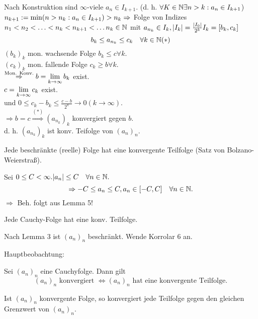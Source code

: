\begin{bew}
	Nach Konstruktion sind \(\infty\)-viele \(a_n\in I_{k+1} \). (d. h. \(\forall K\in\mathbb{N} \exists n>k:a_n\in I_{k+1} \))\\
	\( n_{k+1} := \min (n>n_k: a_n \in I_{k+1}) > n_k\\
	\Rightarrow \) Folge von Indizes \(n_1 <n_2<\ldots<n_k<n_{k+1}<\ldots\\
	n_k\in\mathbb{N} \) mit \( a_{n_k} \in I_k, |I_k| = \frac{|I_0|}{2^k}\\
	I_k = [b_k, c_k] \)
	\[b_k \leq a_{n_k} \leq c_k \quad \forall k\in\mathbb{N} (*) \]
	\( (b_k)_k \) mon. wachsende Folge \(b_k\leq c \forall k \).\\
	\( (c_k)_k \) mon. fallende Folge \( c_k \geq b \forall k \).\\
	\( \overset{\text{Mon. Konv.}}{\Rightarrow} \\b= \lim\limits_{k\rightarrow\infty} b_k \) exist.\\
	\(c = \lim\limits_{k\rightarrow\infty} c_k \) exist.\\
	und \(0 \leq c_k - b_k \leq \frac{c-b}{2^k} \rightarrow0 (k\rightarrow\infty) \).\\
	\(\Rightarrow b=c \overset{(*)}{\Rightarrow} (a_{n_k})_k \) konvergiert gegen \(b\).\\
	d. h. \( (a_{n_k})_k \) ist konv. Teifolge von \( (a_n)_n \).
\end{bew}
\begin{kor}
	Jede beschränkte (reelle) Folge hat eine konvergente Teilfolge (Satz von Bolzano-Weierstraß).
\end{kor}
\begin{bew}
	Sei \( 0\leq C < \infty. |a_n| \leq C \quad\forall n\in\mathbb{N}. \)\\
	\[ \Rightarrow -C \leq a_n \leq C, a_n \in [-C, C] \quad\forall n\in\mathbb{N}. \]
	\( \Rightarrow \) Beh. folgt aus Lemma 5!
\end{bew}
\begin{kor}
	Jede Cauchy-Folge hat eine konv. Teilfolge.
\end{kor}
\begin{bew}
	Nach Lemma 3 ist \( (a_n)_n \) beschränkt. Wende Korrolar 6 an.
\end{bew}
Hauptbeobachtung:
\begin{lem}
	Sei \((a_n)_n\) eine Cauchyfolge. Dann gilt
	\[ (a_n)_n \text{ konvergiert } \Leftrightarrow (a_n)_n \text{ hat eine konvergente Teilfolge.} \]
\end{lem}
\begin{bem}
	Ist \( (a_n)_n \) konvergente Folge, so konvergiert jede Teilfolge gegen den gleichen Grenzwert von \((a_n)_n\).
\end{bem}
